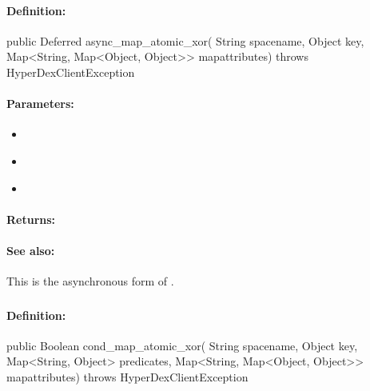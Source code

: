\paragraph{Definition:}
\begin{javacode}
public Deferred async_map_atomic_xor(
        String spacename,
        Object key,
        Map<String, Map<Object, Object>> mapattributes) throws HyperDexClientException
\end{javacode}

\paragraph{Parameters:}
\begin{itemize}[noitemsep]
\item {}\\

\item {}\\

\item {}\\

\end{itemize}

\paragraph{Returns:}


\paragraph{See also:}  This is the asynchronous form of .

\pagebreak
\subsubsection{}
\label{api:java:cond_map_atomic_xor}


\paragraph{Definition:}
\begin{javacode}
public Boolean cond_map_atomic_xor(
        String spacename,
        Object key,
        Map<String, Object> predicates,
        Map<String, Map<Object, Object>> mapattributes) throws HyperDexClientException
\end{javacode}

